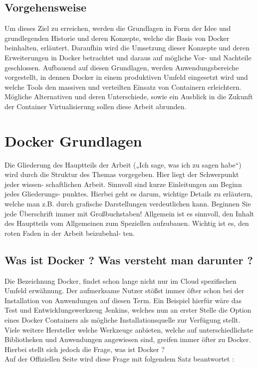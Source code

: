 \documentclass[12pt,toc=bib,toc=listof]{scrreprt}
\begin{document}

\section{Vorgehensweise} %
\label{sec:vorgehensweise}

Um dieses Ziel zu erreichen, werden die Grundlagen in Form der Idee und grundlegenden Historie und deren Konzepte, welche die Basis von Docker beinhalten, erläutert.
Daraufhin wird die Umsetzung dieser Konzepte und deren Erweiterungen in Docker betrachtet und daraus auf mögliche Vor- und Nachteile geschlossen.
Aufbauend auf diesen Grundlagen, werden Anwendungsbereiche vorgestellt, in dennen Docker in einem produktiven Umfeld eingesetzt wird und welche Tools den massiven und verteilten Einsatz von Containern erleichtern.
Mögliche Alternativen und deren Unterschiede, sowie ein Ausblick in die Zukunft der Container Virtualisierung sollen diese Arbeit abrunden.




\chapter{Docker Grundlagen} %
\label{sec:grundlagen}
Die Gliederung des Hauptteils der Arbeit („Ich sage, was ich zu sagen habe“) wird
durch die Struktur des Themas vorgegeben. Hier liegt der Schwerpunkt jeder wissen-
schaftlichen Arbeit. Sinnvoll sind kurze Einleitungen am Beginn jedes Gliederungs-
punktes. Hierbei geht es darum, wichtige Details zu erläutern, welche man z.B. durch
grafische Darstellungen verdeutlichen kann. Beginnen Sie jede Überschrift immer mit
Großbuchstaben! Allgemein ist es sinnvoll, den Inhalt des Hauptteils vom Allgemeinen
zum Speziellen aufzubauen. Wichtig ist es, den roten Faden in der Arbeit beizubehal-
ten.

\section{Was ist Docker ? Was versteht man darunter ?}
Die Bezeichnung Docker, findet schon lange nicht nur im Cloud spezifischen Umfeld erwähnung.
Der aufmerksame Nutzer stößst immer öfter schon bei der Installation von Anwendungen auf diesen Term.
Ein Beispiel hierfür wäre das Test und Entwicklungswerkzeug Jenkins, welches nun an erster Stelle die Option eines Docker Containers als mögliche Installationsquelle zur Verfügung stellt. \cite{jenkins}
Viele weitere Hersteller welche Werkzeuge anbieten, welche auf unterschiedlichste Bibliotheken und Anwendungen angewiesen sind, greifen immer öfter zu Docker. 
Hierbei stellt sich jedoch die Frage, was ist Docker ? \\
Auf der Offiziellen Seite wird diese Frage mit folgendem Satz beantwortet :
\end{document}
